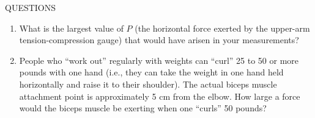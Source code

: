 QUESTIONS

\begin{enumerate}[label=\alph*.]

\item What is the largest value of \(P\) (the horizontal force exerted by the upper-arm tension-compression gauge) that would have arisen in your measurements?

\item People who ``work out'' regularly with weights can ``curl'' 25 to 50 or more pounds with one hand (i.e., they can take the weight in one hand held horizontally and raise it to their shoulder).  The actual biceps muscle attachment point is approximately 5 cm from the elbow.  How large a force would the biceps muscle be exerting when one ``curls'' 50 pounds?

\end{enumerate}
